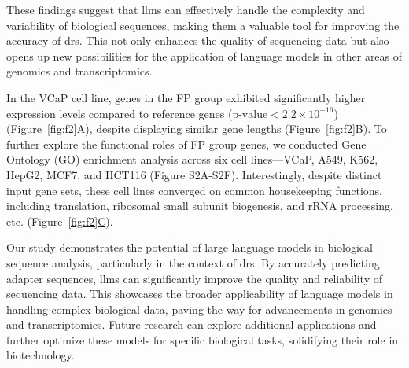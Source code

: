 \documentclass[pdflatex, sn-mathphys-num, lineno]{sn-jnl}%
\newcommand{\figref}[2]{Figure~\hyperref[#1]{\ref*{#1}#2}}
\theoremstyle{thmstyleone}%
\theoremstyle{thmstyletwo}%
\theoremstyle{thmstylethree}%
\begin{document}
These findings suggest that \glspl{llm} can effectively handle the complexity and variability of biological sequences, making them a valuable tool for improving the accuracy of \gls{drs}.
This not only enhances the quality of sequencing data but also opens up new possibilities for the application of language models in other areas of genomics and transcriptomics.



In the VCaP cell line, genes in the FP group exhibited significantly higher expression levels compared to reference genes (\(\textrm{p-value} < 2.2 \times 10^{-16}\)) (\figref{fig:f2}{A}), despite displaying similar gene lengths (\figref{fig:f2}{B}).
To further explore the functional roles of FP group genes, we conducted Gene Ontology (GO) enrichment analysis across six cell lines—VCaP, A549, K562, HepG2, MCF7, and HCT116 (Figure S2A-S2F).
Interestingly, despite distinct input gene sets, these cell lines converged on common housekeeping functions, including translation, ribosomal small subunit biogenesis, and rRNA processing, etc. (\figref{fig:f2}{C}).

Our study demonstrates the potential of large language models in biological sequence analysis, particularly in the context of \gls{drs}.
By accurately predicting adapter sequences,  \glspl{llm} can significantly improve the quality and reliability of sequencing data.
This showcases the broader applicability of language models in handling complex biological data, paving the way for advancements in genomics and transcriptomics.
Future research can explore additional applications and further optimize these models for specific biological tasks, solidifying their role in biotechnology.
\end{document}
